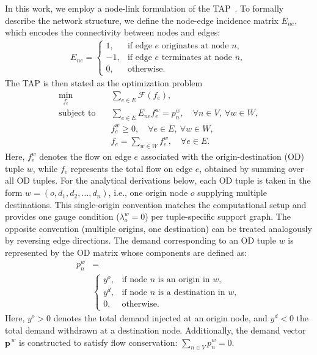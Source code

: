 \documentclass[twocolumn,english,groupedaddress, superscriptaddress,aps,pre,10pt,floatfix]{revtex4-2}
\renewcommand{\vec}[1]{{\boldsymbol{#1}}}
\begin{document}
In this work, we employ a node-link formulation of the TAP~\cite{nguyen1974algorithm}. To formally describe the network structure, we define the node-edge incidence matrix $E_{ne}$, which encodes the connectivity between nodes and edges:
\begin{align}\label{eq:edge-incidence}
    E_{ne} = 
    \begin{cases} 
    1, & \text{if edge } e \text{ originates at node } n, \\
    -1, & \text{if edge } e \text{ terminates at node } n, \\
    0, & \text{otherwise}.
    \end{cases}
\end{align}
The TAP is then stated as the optimization problem
\begin{align}\label{eq:tap-node-link}
    \min_{f_e} \quad & \sum_{e \in E} \mathcal{F}(f_e), \nonumber \\
    \text{subject to} \quad & \sum_{e \in E} E_{ne} f^w_e = p_n^w, \quad \forall n \in V,\ \forall w \in W, \nonumber \\
    & f^w_e \geq 0, \quad \forall e \in E,\ \forall w \in W, \nonumber \\
    & f_e = \sum_{w \in W} f_e^w, \quad \forall e \in E.
\end{align}
Here, $f_e^w$ denotes the flow on edge $e$ associated with the origin-destination (OD) tuple $w$, while $f_e$ represents the total flow on edge $e$, obtained by summing over all OD tuples.
For the analytical derivations below, each OD tuple is taken in the form $w=(o,d_1,d_2,\dots,d_n)$, i.e., one origin node $o$ supplying multiple destinations. This single-origin convention matches the computational setup and provides one gauge condition ($\lambda_o^w=0$) per tuple-specific support graph. The opposite convention (multiple origins, one destination) can be treated analogously by reversing edge directions.
The demand corresponding to an OD tuple $w$ is represented by the OD matrix whose components are defined as:
\begin{align}
    p^w_n &=\\
    &\begin{cases}
        y^o, & \text{if node } n \text{ is an origin in } w,\\[1mm]
        y^d, & \text{if node } n \text{ is a destination in } w,\\[1mm]
        0, & \text{otherwise}.
    \end{cases}
\end{align}
Here, $y^o>0$ denotes the total demand injected at an origin node, and $y^d<0$ the total demand withdrawn at a destination node. Additionally, the demand vector $\vec{p}^{\,w}$ is constructed to satisfy flow conservation: $\sum_{n \in V} p^w_n = 0.$
\end{document}
